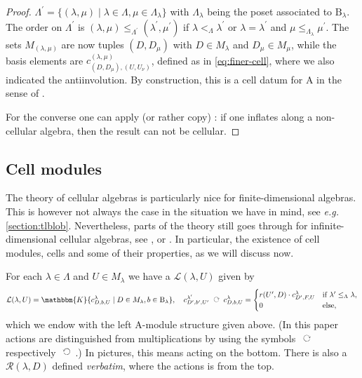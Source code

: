 \documentclass[a4paper,11pt]{amsart}
\let\emph\relax
\newcommand{\eg}{\textsl{e.g.}}
\newcommand{\ver}{\textsl{verbatim}}
\newcommand{\actsleft}{\mathop{\,\;\raisebox{1.7ex}{\rotatebox{-90}{$\circlearrowright$}}\;\,}}
\newcommand{\actsright}{\mathop{\,\;\raisebox{0ex}{\rotatebox{90}{$\circlearrowleft$}}\;\,}}
\newcommand{\setstuff}[1]{\mathrm{#1}}
\newcommand{\KK}{\mathbbm{K}}
\numberwithin{equation}{section}
\let\fullref\autoref
\begin{document}
\begin{proof}
$\Lambda^{\prime}=\{(\lambda,\mu)
\mid\lambda\in\Lambda,\mu\in\Lambda_{\lambda}\}$ with $\Lambda_{\lambda}$ 
being the poset associated to $\setstuff{B}_{\lambda}$. The order on 
$\Lambda^{\prime}$ is $(\lambda,\mu)\leq_{\Lambda^{\prime}}(\lambda^{\prime},\mu^{\prime})$ 
if $\lambda<_{\Lambda}\lambda^{\prime}$ or 
$\lambda=\lambda^{\prime}$ and $\mu\leq_{\Lambda_{\lambda}}\mu^{\prime}$. 
The sets $M_{(\lambda,\mu)}$ are now tuples $(D,D_{\mu})$ 
with $D\in M_{\lambda}$ and $D_{\mu}\in M_{\mu}$, while the basis 
elements are $c_{(D,D_{\mu}),(U,U_{\nu})}^{(\lambda,\mu)}$, defined 
as in \eqref{eq:finer-cell}, where we also 
indicated the antiinvolution. By construction, this 
is a cell datum for $\setstuff{A}$ in the sense of \cite{GrLe-cellular}.

For the converse one can apply (or rather copy)
\cite[Sections 3 and 4]{KoXi-cellular-inflation-morita}: if one 
inflates along a non-cellular algebra, then the result can not 
be cellular.
\end{proof}

\subsection{Cell modules}\label{subsection:cell-modules}

The theory of cellular algebras is particularly nice 
for finite-dimensional algebras. This is however not always the 
case in the situation we have in mind, 
see {\eg} \fullref{section:tlblob}. Nevertheless, 
parts of the theory still goes through for 
infinite-dimensional cellular algebras, see \cite{GrLe-cellular}, \cite{KoXi-affine-cellular} or \cite{EhTu-relcell}. In particular, the 
existence of cell modules, cells 
and some of their properties, as we will discuss now.

For each $\lambda\in\Lambda$ and $U\in M_{\lambda}$ we have a \emph{left
cell} $\mathcal{L}(\lambda,U)$ given by
\begin{gather*}
\mathcal{L}(\lambda,U)=\KK\{
c_{D,b,U}^{\lambda}\mid D\in M_{\lambda},b\in\setstuff{B}_{\lambda}\}
,\quad
c_{D^{\prime},b^{\prime},U^{\prime}}^{\lambda^{\prime}}\actsleft
c_{D,b,U}^{\lambda}
=
\begin{cases}
r(U^{\prime},D)\cdot
c_{D^{\prime},F,U}^{\lambda}&\text{if }
\lambda^{\prime}\leq_{\Lambda}\lambda,
\\
0&\text{else},
\end{cases}
\end{gather*}
which we endow with the left $\setstuff{A}$-module 
structure given above. 
(In this paper actions are distinguished from multiplications 
by using the symbols $\actsleft$ respectively 
$\actsright$.) In pictures, this means acting on the bottom.
There is also a \emph{right 
cell} $\mathcal{R}(\lambda,D)$ 
defined {\ver}, where the actions is from the top.
\end{document}
